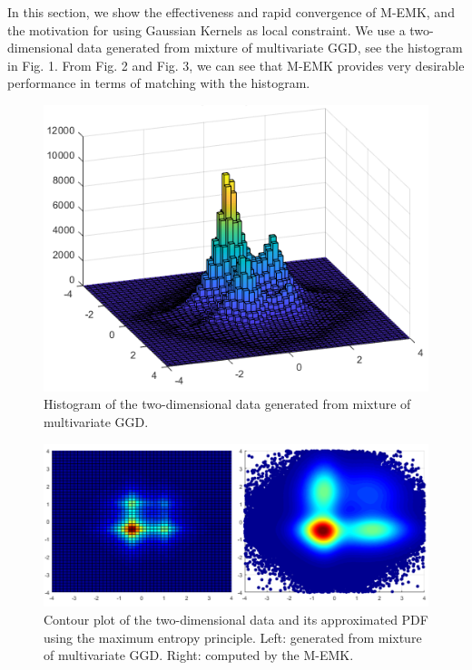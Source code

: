 \documentclass[conference]{IEEEtran}
\begin{document}
In this section, we show the effectiveness and rapid convergence of M-EMK, and the motivation for using Gaussian Kernels as local constraint.
% 
We use a two-dimensional data generated from mixture of multivariate GGD, see the histogram in Fig. 1. From Fig. 2 and Fig. 3, we can see that M-EMK provides very desirable performance in terms of matching with the histogram. 
\begin{figure}[H]
	\centering
	\includegraphics[width=1\linewidth]{hist3D}
	\caption{Histogram of the two-dimensional data generated from mixture of multivariate GGD.}
	\label{fig}
\end{figure}

\begin{figure}[H]
	\centering
	\includegraphics[width=1\linewidth]{ContourMatching}
	\caption{Contour plot of the two-dimensional data and its approximated PDF using the maximum entropy principle. Left: generated from mixture of multivariate GGD. Right: computed by the M-EMK.}
	\label{fig:mesh1}
\end{figure}
\end{document}
